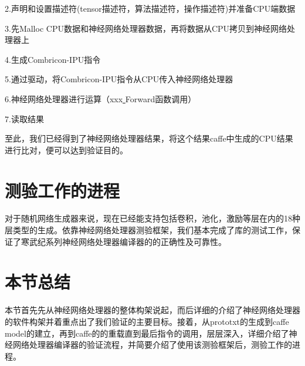 2.声明和设置描述符(tensor描述符，算法描述符，操作描述符)并准备CPU端数据

3.先Malloc CPU数据和神经网络处理器数据，再将数据从CPU拷贝到神经网络处理器上

4.生成Combricon-IPU指令

5.通过驱动，将Combricon-IPU指令从CPU传入神经网络处理器

6.神经网络处理器进行运算（xxx\underline{ }Forward函数调用）

7.读取结果

至此，我们已经得到了神经网络处理器结果，将这个结果caffe中生成的CPU结果进行比对，便可以达到验证目的。
\section{测验工作的进程}
对于随机网络生成器来说，现在已经能支持包括卷积，池化，激励等层在内的18种层类型的生成。依靠神经网络处理器测验框架，我们基本完成了库的测试工作，保证了寒武纪系列神经网络处理器编译器的的正确性及可靠性。
\section{本节总结}
本节首先先从神经网络处理器的整体构架说起，而后详细的介绍了神经网络处理器的软件构架并着重点出了我们验证的主要目标。接着，从prototxt的生成到caffe\underline{ }model的建立，再到caffe的的重载直到最后指令的调用，层层深入，详细介绍了神经网络处理器编译器的验证流程，并简要介绍了使用该测验框架后，测验工作的进程。